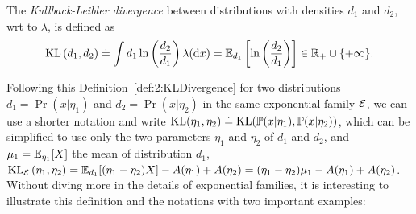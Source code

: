 \begin{definition}\label{def:2:KLDivergence}
\begin{leftbar}[defnbar]  %
    The \emph{Kullback-Leibler divergence} between distributions
    with densities $d_1$ and $d_2$, wrt to $\lambda$, is defined as
    \begin{align}\label{eq:2:Kullback-LeiblerDivergenceExpFamily1}
        \mathrm{KL}\left(d_1, d_2\right) \overset{.}{=} \int d_1 \ln\left(\frac{d_2}{d_1}\right) \lambda(\mathrm{d}x) = \mathbb{E}_{d_1} \left[ \ln\left(\frac{d_2}{d_1}\right) \right] \in \mathbb{R}_{+}\cup\{+\infty\}.
    \end{align}
\end{leftbar}  %
\end{definition}

Following this Definition~\ref{def:2:KLDivergence} for two distributions
$d_1=\Pr(x|\eta_1)$ and $d_2=\Pr(x|\eta_2)$ in the same exponential family $\mathcal{E}$,
we can use a shorter notation and write $\mathrm{KL}( \eta_1, \eta_2 ) \overset{.}{=} \mathrm{KL}(\mathbb{P}(x|\eta_1), \mathbb{P}(x|\eta_2))$, which can be simplified to use only the two parameters $\eta_1$ and $\eta_2$ of $d_1$ and $d_2$,
and $\mu_1 = \mathbb{E}_{\eta_1}[X]$ the mean of distribution $d_1$,
%
$\mathrm{KL}_{\mathcal{E}}\left( \eta_1, \eta_2 \right) = \mathbb{E}_{d_1}[ (\eta_1 - \eta_2) X ] - A(\eta_1) + A(\eta_2) = (\eta_1 - \eta_2) \mu_1 - A(\eta_1) + A(\eta_2)$.
%
Without diving more in the details of exponential families,
it is interesting to illustrate this definition and the notations with two important examples:

